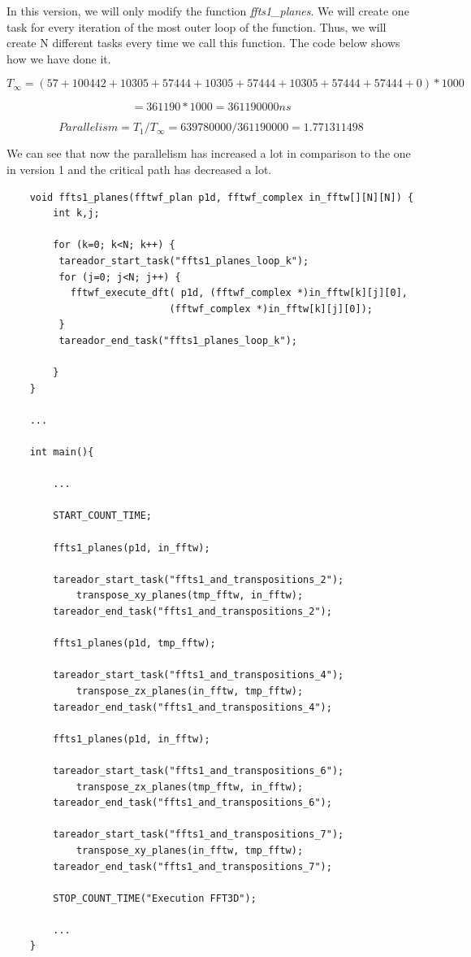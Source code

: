 \documentclass[12pt, a4paper]{article}
\begin{document}
In this version, we will only modify the function \textit{ffts1\_planes}. We will create one task for every iteration of the most outer loop of the function. Thus, we will create N different tasks every time we call this function. The code below shows how we have done it.

\[ T_\infty = (57 + 100442 + 10305 + 57444 + 10305 + 57444 + 10305 + 57444 + 57444 + 0) * 1000\]

\[ = 361190 * 1000 = 361190000 ns \]

\[ Parallelism = T_1/T_\infty = 639780000/361190000 = 1.771311498 \]

We can see that now the parallelism has increased a lot in comparison to the one in version 1 and the critical path has decreased a lot.

\begin{lstlisting}
	void ffts1_planes(fftwf_plan p1d, fftwf_complex in_fftw[][N][N]) {
	    int k,j;
	
	    for (k=0; k<N; k++) {
	     tareador_start_task("ffts1_planes_loop_k");
	     for (j=0; j<N; j++) {
	       fftwf_execute_dft( p1d, (fftwf_complex *)in_fftw[k][j][0],
	       					(fftwf_complex *)in_fftw[k][j][0]);
	     }
	     tareador_end_task("ffts1_planes_loop_k");
	
	    }
	}

	...

	int main(){
	
		...
	
		START_COUNT_TIME;
	
	    ffts1_planes(p1d, in_fftw);
	
	    tareador_start_task("ffts1_and_transpositions_2");
	        transpose_xy_planes(tmp_fftw, in_fftw);
	    tareador_end_task("ffts1_and_transpositions_2");
	
	    ffts1_planes(p1d, tmp_fftw);
	
	    tareador_start_task("ffts1_and_transpositions_4");
	        transpose_zx_planes(in_fftw, tmp_fftw);
	    tareador_end_task("ffts1_and_transpositions_4");
	
	    ffts1_planes(p1d, in_fftw);
	
	    tareador_start_task("ffts1_and_transpositions_6");
	        transpose_zx_planes(tmp_fftw, in_fftw);
	    tareador_end_task("ffts1_and_transpositions_6");
	
	    tareador_start_task("ffts1_and_transpositions_7");
	        transpose_xy_planes(in_fftw, tmp_fftw);
	    tareador_end_task("ffts1_and_transpositions_7");
	     
    	STOP_COUNT_TIME("Execution FFT3D");
    	
    	...
    }
\end{lstlisting}
\end{document}
